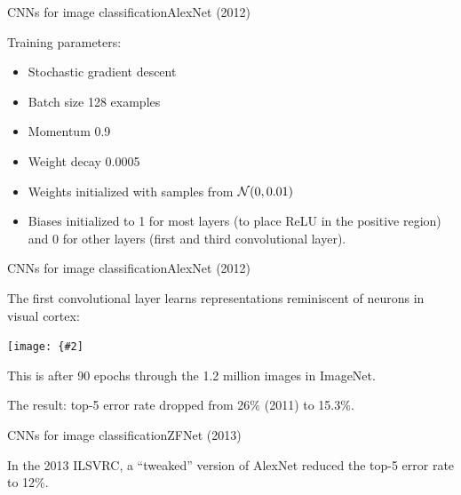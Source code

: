 \documentclass{beamer}
\newcommand{\myfig}[3]{\centerline{\texttt{[image: \{\#2]}}}
\begin{document}
\begin{frame}{CNNs for image classification}{AlexNet (2012)}

  Training parameters:
  \begin{itemize}
  \item Stochastic gradient descent
  \item Batch size 128 examples
  \item Momentum 0.9
  \item Weight decay 0.0005
  \item Weights initialized with samples from ${\cal N}(0,0.01)$
  \item Biases initialized to 1 for most layers (to place ReLU in the
    positive region) and 0 for other layers (first and third
    convolutional layer).
  \end{itemize}

  \end{frame}


\begin{frame}{CNNs for image classification}{AlexNet (2012)}

  The first convolutional layer learns representations reminiscent of
  neurons in visual cortex:

  \myfig{2in}{krizhevsky-fig3}{Krizhevsky et al.\ (2012), Fig.\ 3}

  This is after 90 epochs through the 1.2 million images in ImageNet.
  
  \medskip

  The result: top-5 error rate dropped from 26\% (2011) to 15.3\%. 
  
\end{frame}


\begin{frame}{CNNs for image classification}{ZFNet (2013)}

  In the 2013 ILSVRC, a ``tweaked'' version of AlexNet reduced the
  top-5 error rate to 12\%.
  
\end{frame}
\end{document}
